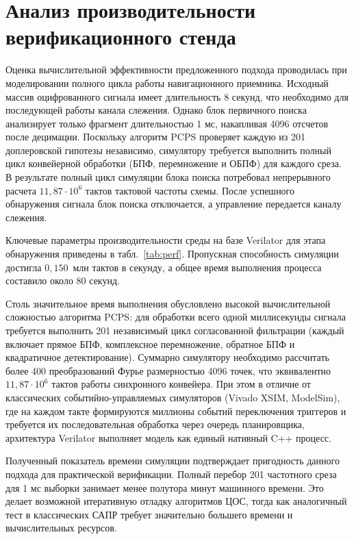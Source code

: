 \section{Анализ производительности верификационного стенда}

Оценка вычислительной эффективности предложенного подхода проводилась при моделировании полного цикла работы навигационного приемника. Исходный массив оцифрованного сигнала имеет длительность 8 секунд, что необходимо для последующей работы канала слежения. Однако блок первичного поиска анализирует только фрагмент длительностью 1 мс, накапливая 4096 отсчетов после децимации. Поскольку алгоритм PCPS проверяет каждую из 201 доплеровской гипотезы независимо, симулятору требуется выполнить полный цикл конвейерной обработки (БПФ, перемножение и ОБПФ) для каждого среза. В результате полный цикл симуляции блока поиска потребовал непрерывного расчета \(11{,}87 \cdot 10^6\) тактов тактовой частоты схемы. После успешного обнаружения сигнала блок поиска отключается, а управление передается каналу слежения.

Ключевые параметры производительности среды на базе Verilator для этапа обнаружения приведены в табл.~\ref{tab:perf}. Пропускная способность симуляции достигла \(0{,}150\)~млн тактов в секунду, а общее время выполнения процесса составило около 80 секунд. 

Столь значительное время выполнения обусловлено высокой вычислительной сложностью алгоритма PCPS: для обработки всего одной миллисекунды сигнала требуется выполнить 201 независимый цикл согласованной фильтрации (каждый включает прямое БПФ, комплексное перемножение, обратное БПФ и квадратичное детектирование). Суммарно симулятору необходимо рассчитать более 400 преобразований Фурье размерностью 4096 точек, что эквивалентно \(11{,}87 \cdot 10^6\) тактов работы синхронного конвейера. При этом в отличие от классических событийно-управляемых симуляторов (Vivado XSIM, ModelSim), где на каждом такте формируются миллионы событий переключения триггеров и требуется их последовательная обработка через очередь планировщика, архитектура Verilator выполняет модель как единый нативный C++ процесс. 

Полученный показатель времени симуляции подтверждает пригодность данного подхода для практической верификации. Полный перебор 201 частотного среза для 1 мс выборки занимает менее полутора минут машинного времени. Это делает возможной итеративную отладку алгоритмов ЦОС, тогда как аналогичный тест в классических САПР требует значительно большего времени и вычислительных ресурсов.


